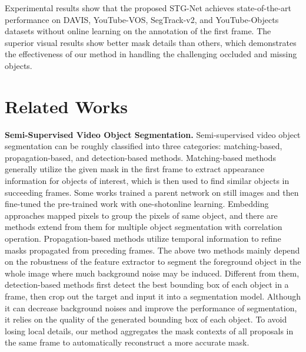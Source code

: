 \documentclass[letterpaper]{article} \usepackage{aaai21}  \usepackage{times}  \usepackage{helvet} \usepackage{courier}  \usepackage[hyphens]{url}  \usepackage{graphicx} \urlstyle{rm} \def\UrlFont{\rm}  \usepackage{graphicx}  \usepackage{natbib}  \usepackage{caption} \frenchspacing  \setlength{\pdfpagewidth}{8.5in}  \setlength{\pdfpageheight}{11in}  \usepackage{amsmath}
\begin{document}
Experimental results show that the proposed STG-Net achieves state-of-the-art performance on DAVIS, YouTube-VOS, SegTrack-v2, and YouTube-Objects datasets without online learning on the annotation of the first frame. The superior visual results show better mask details than others, which demonstrates the effectiveness of our method in handling the challenging occluded and missing objects.

\section{Related Works}
\noindent \textbf{Semi-Supervised Video Object Segmentation.}
Semi-supervised video object segmentation can be roughly classified into three categories: matching-based, propagation-based, and detection-based methods. Matching-based methods \cite{caelles2017one,voigtlaender2017online,zeng2019dmm} generally utilize the given mask in the first frame to extract appearance information for objects of interest, which is then used to find similar objects in succeeding frames. 
Some works \cite{caelles2017one,voigtlaender2017online} trained a parent network on still images and then fine-tuned the pre-trained work with one-shotonline learning. 
Embedding approaches \cite{chen2018blazingly,hu2018videomatch} mapped pixels to group the pixels of same object, and there are methods \cite{voigtlaender2019feelvos,wang2019ranet} extend from them for multiple object segmentation with correlation operation.
Propagation-based methods \cite{wug2018fast,johnander2019generative,xu2019mhp} utilize temporal information to refine masks propagated from preceding frames.
The above two methods mainly depend on the robustness of the feature extractor to segment the foreground object in the whole image where much background noise may be induced. Different from them, detection-based methods \cite{li2017video,wang2019fast,luiten2018premvos} first detect the best bounding box of each object in a frame, then crop out the target and input it into a segmentation model. Although it can decrease background noises and improve the performance of segmentation, it relies on the quality of the generated bounding box of each object. To avoid losing local details, our method aggregates the mask contexts of all proposals in the same frame to automatically reconstruct a more accurate mask.
\end{document}
